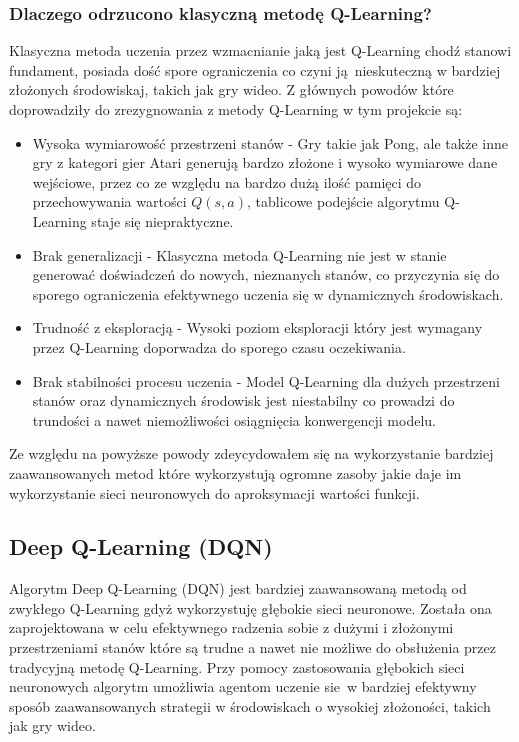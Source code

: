 \documentclass[a4paper, 12pt]{article}
\begin{document}
    \subsubsection{Dlaczego odrzucono klasyczną metodę Q-Learning?}
    Klasyczna metoda uczenia przez wzmacnianie jaką jest Q-Learning chodź stanowi fundament, posiada dość spore ograniczenia co 
    czyni ją nieskuteczną w bardziej złożonych środowiskaj, takich jak gry wideo. Z głównych powodów które doprowadziły 
    do zrezygnowania z metody Q-Learning w tym projekcie są:
    \begin{itemize}
        \item Wysoka wymiarowość przestrzeni stanów - Gry takie jak Pong, ale także inne gry z kategori gier Atari generują bardzo złożone 
        i wysoko wymiarowe dane wejściowe, przez co ze względu na bardzo dużą ilość pamięci do przechowywania wartości \( Q(s,a) \),
        tablicowe podejście algorytmu Q-Learning staje się niepraktyczne.
        \item Brak generalizacji - Klasyczna metoda Q-Learning nie jest w stanie generować doświadczeń do nowych, nieznanych stanów, co 
        przyczynia się do sporego ograniczenia efektywnego uczenia się w dynamicznych środowiskach.
        \item Trudność z eksploracją - Wysoki poziom eksploracji który jest wymagany przez Q-Learning doporwadza do sporego czasu oczekiwania.
        \item Brak stabilności procesu uczenia - Model Q-Learning dla dużych przestrzeni stanów oraz dynamicznych środowisk jest niestabilny co prowadzi
        do trundości a nawet niemożliwości osiągnięcia konwergencji modelu. 
    \end{itemize}
    Ze względu na powyższe powody zdeycydowałem się na wykorzystanie bardziej zaawansowanych metod które wykorzystują ogromne zasoby jakie daje im 
    wykorzystanie sieci neuronowych do aproksymacji wartości funkcji.
    \subsection{Deep Q-Learning (DQN)}
    Algorytm Deep Q-Learning (DQN) jest bardziej zaawansowaną metodą od zwykłego Q-Learning gdyż wykorzystuję głębokie sieci neuronowe.
    Została ona zaprojektowana w celu efektywnego radzenia sobie z dużymi i złożonymi przestrzeniami stanów które są trudne a nawet nie możliwe
    do obsłużenia przez tradycyjną metodę Q-Learning. Przy pomocy zastosowania głębokich sieci neuronowych algorytm umożliwia agentom
    uczenie sie w bardziej efektywny sposób zaawansowanych strategii w środowiskach o wysokiej złożoności, takich jak gry wideo.
\end{document}
